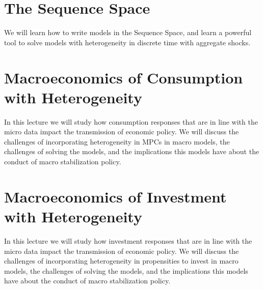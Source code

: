 \documentclass [12pt]{article}
\begin{document}
\section{The Sequence Space}

We will learn how to write models in the Sequence Space, and learn a powerful tool to solve models with heterogeneity in discrete time with aggregate shocks.


\section{Macroeconomics of Consumption with Heterogeneity}

In this lecture we will study how consumption responses that are in line with the micro data impact the transmission of economic policy. We will discuss the challenges of incorporating heterogeneity in MPCs in macro models, the challenges of solving the models, and the implications this models have about the conduct of macro stabilization policy.

\section{Macroeconomics of Investment with Heterogeneity}

In this lecture we will study how investment responses that are in line with the micro data impact the transmission of economic policy. We will discuss the challenges of incorporating heterogeneity in propensities to invest in macro models, the challenges of solving the models, and the implications this models have about the conduct of macro stabilization policy.
\end{document}
